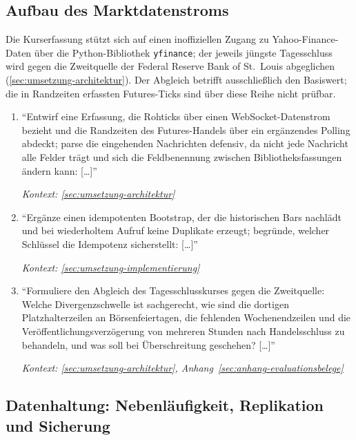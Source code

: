 \subsection{Aufbau des Marktdatenstroms}
\label{sec:prompts-claude-datenstrom}

Die Kurserfassung stützt sich auf einen inoffiziellen Zugang zu
Yahoo-Finance-Daten über die Python-Bibliothek \texttt{yfinance}; der jeweils
jüngste Tagesschluss wird gegen die Zweitquelle der Federal Reserve Bank of
St.\ Louis abgeglichen (\cref{sec:umsetzung-architektur}). Der Abgleich
betrifft ausschließlich den Basiswert; die in Randzeiten erfassten
Futures-Ticks sind über diese Reihe nicht prüfbar.

\begin{enumerate}
    \item \enquote{Entwirf eine Erfassung, die Rohticks über einen
            WebSocket-Datenstrom bezieht und die Randzeiten des
            Futures-Handels über ein ergänzendes Polling abdeckt; parse die
            eingehenden Nachrichten defensiv, da nicht jede Nachricht alle
            Felder trägt und sich die Feldbenennung zwischen
            Bibliotheksfassungen ändern kann: [\dots]}
            \par\hfill\textit{Kontext: \cref{sec:umsetzung-architektur}}

    \item \enquote{Ergänze einen idempotenten Bootstrap, der die historischen
            Bars nachlädt und bei wiederholtem Aufruf keine Duplikate erzeugt;
            begründe, welcher Schlüssel die Idempotenz sicherstellt: [\dots]}
            \par\hfill\textit{Kontext: \cref{sec:umsetzung-implementierung}}

    \item \enquote{Formuliere den Abgleich des Tagesschlusskurses gegen die
            Zweitquelle: Welche Divergenzschwelle ist sachgerecht, wie sind
            die dortigen Platzhalterzeilen an Börsenfeiertagen, die fehlenden
            Wochenendzeilen und die Veröffentlichungsverzögerung von mehreren
            Stunden nach Handelsschluss zu behandeln, und was soll bei
            Überschreitung geschehen? [\dots]}
            \par\hfill\textit{Kontext: \cref{sec:umsetzung-architektur},
            Anhang~\ref{sec:anhang-evaluationsbelege}}
\end{enumerate}

\subsection{Datenhaltung: Nebenläufigkeit, Replikation und Sicherung}
\label{sec:prompts-claude-datenhaltung}

